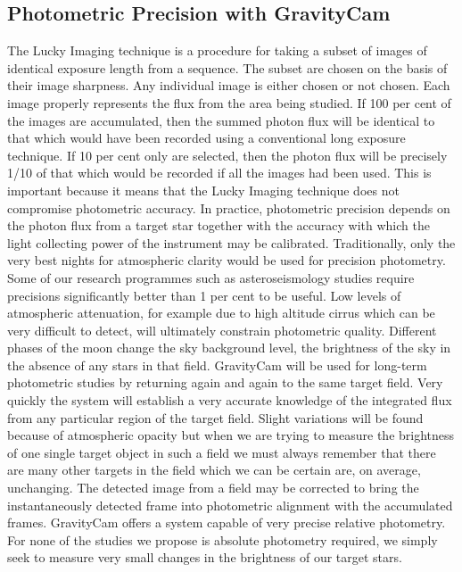 \documentclass{pasa}%
\begin{document}






\subsection{Photometric Precision with GravityCam}

The Lucky Imaging technique is a procedure for taking a subset of images of identical exposure length from a sequence. The subset are chosen on the basis of their image sharpness. Any individual image is either chosen or not chosen. Each image properly represents the flux from the area being studied. If 100 per cent of the images are accumulated, then the summed photon flux will be identical to that which would have been recorded using a conventional long exposure technique. If 10 per cent only are selected, then the photon flux will be precisely 1/10 of that which would be recorded if all the images had been used. This is important because it means that the Lucky Imaging technique does not compromise photometric accuracy. In practice, photometric precision depends on the photon flux from a target star together with the accuracy with which the light collecting power of the instrument may be calibrated. Traditionally, only the very best nights for atmospheric clarity would be used for precision photometry. Some of our research programmes such as asteroseismology studies require precisions significantly better than 1 per cent to be useful. Low levels of atmospheric attenuation, for example due to high altitude cirrus which can be very difficult to detect, will ultimately constrain photometric quality. Different phases of the moon change the sky background level, the brightness of the sky in the absence of any stars in that field. GravityCam will be used for long-term photometric studies by returning
again and again to the same target field. Very quickly the system will establish a very accurate knowledge of the integrated flux from any particular region of the target field. Slight variations will be found because of atmospheric opacity but when we are trying to measure the brightness of one single target object in such a field we must always remember that there are many other targets in the field which we can be certain are, on average, unchanging. The detected image from a field may be corrected to bring the instantaneously detected frame into photometric alignment with the accumulated frames. GravityCam offers a system capable of very precise relative photometry. For none of the studies we propose is absolute photometry required, we simply seek to measure very small changes in the brightness of our target stars.
\end{document}
